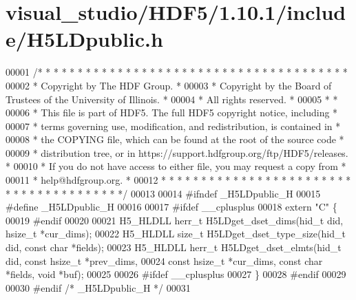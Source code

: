 \hypertarget{visual__studio_2_h_d_f5_21_810_81_2include_2_h5_l_dpublic_8h_source}{}\section{visual\+\_\+studio/\+H\+D\+F5/1.10.1/include/\+H5\+L\+Dpublic.h}
\label{visual__studio_2_h_d_f5_21_810_81_2include_2_h5_l_dpublic_8h_source}

\begin{DoxyCode}
00001 \textcolor{comment}{/* * * * * * * * * * * * * * * * * * * * * * * * * * * * * * * * * * * * * * *}
00002 \textcolor{comment}{ * Copyright by The HDF Group.                                               *}
00003 \textcolor{comment}{ * Copyright by the Board of Trustees of the University of Illinois.         *}
00004 \textcolor{comment}{ * All rights reserved.                                                      *}
00005 \textcolor{comment}{ *                                                                           *}
00006 \textcolor{comment}{ * This file is part of HDF5.  The full HDF5 copyright notice, including     *}
00007 \textcolor{comment}{ * terms governing use, modification, and redistribution, is contained in    *}
00008 \textcolor{comment}{ * the COPYING file, which can be found at the root of the source code       *}
00009 \textcolor{comment}{ * distribution tree, or in https://support.hdfgroup.org/ftp/HDF5/releases.  *}
00010 \textcolor{comment}{ * If you do not have access to either file, you may request a copy from     *}
00011 \textcolor{comment}{ * help@hdfgroup.org.                                                        *}
00012 \textcolor{comment}{ * * * * * * * * * * * * * * * * * * * * * * * * * * * * * * * * * * * * * * */}
00013 
00014 \textcolor{preprocessor}{#ifndef \_H5LDpublic\_H}
00015 \textcolor{preprocessor}{#define \_H5LDpublic\_H}
00016 
00017 \textcolor{preprocessor}{#ifdef \_\_cplusplus}
00018 \textcolor{keyword}{extern} \textcolor{stringliteral}{"C"} \{
00019 \textcolor{preprocessor}{#endif}
00020 
00021 H5\_HLDLL herr\_t H5LDget\_dset\_dims(hid\_t did, hsize\_t *cur\_dims);
00022 H5\_HLDLL \textcolor{keywordtype}{size\_t} H5LDget\_dset\_type\_size(hid\_t did, \textcolor{keyword}{const} \textcolor{keywordtype}{char} *fields);
00023 H5\_HLDLL herr\_t H5LDget\_dset\_elmts(hid\_t did, \textcolor{keyword}{const} hsize\_t *prev\_dims,
00024     \textcolor{keyword}{const} hsize\_t *cur\_dims, \textcolor{keyword}{const} \textcolor{keywordtype}{char} *fields, \textcolor{keywordtype}{void} *buf);
00025 
00026 \textcolor{preprocessor}{#ifdef \_\_cplusplus}
00027 \}
00028 \textcolor{preprocessor}{#endif}
00029 
00030 \textcolor{preprocessor}{#endif }\textcolor{comment}{/* \_H5LDpublic\_H */}\textcolor{preprocessor}{}
00031 
\end{DoxyCode}
